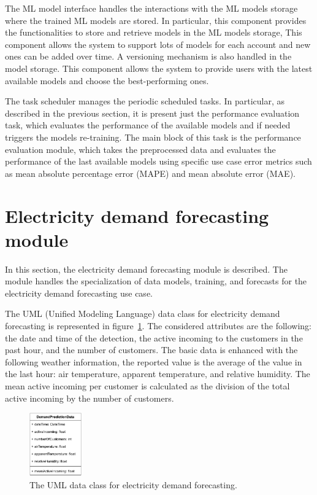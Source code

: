 The ML model interface handles the interactions with the ML models storage where the trained ML models are stored.
In particular, this component provides the functionalities to store and retrieve models in the ML models storage,
This component allows the system to support lots of models for each account and new ones can be added over time.
A versioning mechanism is also handled in the model storage.
This component allows the system to provide users with the latest available models and choose the best-performing ones.

The task scheduler manages the periodic scheduled tasks.
In particular, as described in the previous section, it is present just the performance evaluation task, which evaluates the performance of the available models and if needed triggers the models re-training.
The main block of this task is the performance evaluation module, which takes the preprocessed data and evaluates the performance of the last available models using specific use case error metrics such as mean absolute percentage error (MAPE) and mean absolute error (MAE).


\section{Electricity demand forecasting module}
\label{sec:demandmodel}
\vspace{0.2 cm}

In this section, the electricity demand forecasting module is described.
The module handles the specialization of data models, training, and forecasts for the electricity demand forecasting use case.

The UML (Unified Modeling Language) data class for electricity demand forecasting is represented in figure~\ref{fig:umldemand}.
The considered attributes are the following: the date and time of the detection, the active incoming to the customers in the past hour, and the number of customers.
The basic data is enhanced with the following weather information, the reported value is the average of the value in the last hour: air temperature, apparent temperature, and relative humidity.
The mean active incoming per customer is calculated as the division of the total active incoming by the number of customers.

\begin{figure}[H]
\centering
\includegraphics[width=0.20\textwidth]{images/demand_prediction_uml}
\caption{The UML data class for electricity demand forecasting.}
\label{fig:umldemand}
\end{figure}

